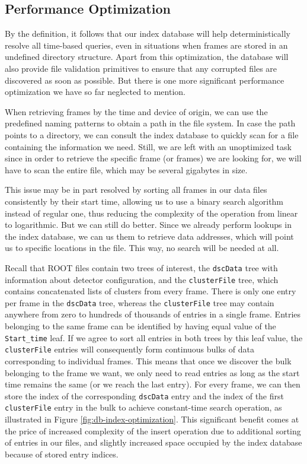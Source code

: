 \subsection{Performance Optimization}
By the definition, it follows that our index database will help deterministically resolve all time-based queries, even in situations when frames are stored in an undefined directory structure. Apart from this optimization, the database will also provide file validation primitives to ensure that any corrupted files are discovered as soon as possible. But there is one more significant performance optimization we have so far neglected to mention.

When retrieving frames by the time and device of origin, we can use the predefined naming patterns to obtain a path in the file system. In case the path points to a directory, we can consult the index database to quickly scan for a file containing the information we need. Still, we are left with an unoptimized task since in order to retrieve the specific frame (or frames) we are looking for, we will have to scan the entire file, which may be several gigabytes in size.

This issue may be in part resolved by sorting all frames in our data files consistently by their start time, allowing us to use a binary search algorithm instead of regular one, thus reducing the complexity of the operation from linear to logarithmic. But we can still do better. Since we already perform lookups in the index database, we can us them to retrieve data addresses, which will point us to specific locations in the file. This way, no search will be needed at all.

Recall that ROOT files contain two trees of interest, the \texttt{dscData} tree with information about detector configuration, and the \texttt{clusterFile} tree, which contains concatenated lists of clusters from every frame. There is only one entry per frame in the \texttt{dscData} tree, whereas the \texttt{clusterFile} tree may contain anywhere from zero to hundreds of thousands of entries in a single frame. Entries belonging to the same frame can be identified by having equal value of the \texttt{Start\_time} leaf. If we agree to sort all entries in both trees by this leaf value, the \texttt{clusterFile} entries will consequently form continuous bulks of data corresponding to individual frames. This means that once we discover the bulk belonging to the frame we want, we only need to read entries as long as the start time remains the same (or we reach the last entry). For every frame, we can then store the index of the corresponding \texttt{dscData} entry and the index of the first \texttt{clusterFile} entry in the bulk to achieve constant-time search operation, as illustrated in Figure \ref{fig:db-index-optimization}. This significant benefit comes at the price of increased complexity of the insert operation due to additional sorting of entries in our files, and slightly increased space occupied by the index database because of stored entry indices.

